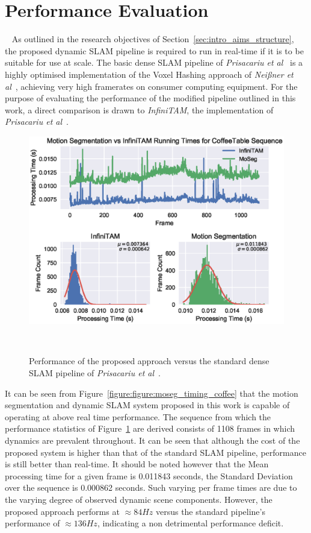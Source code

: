 \section{Performance Evaluation}
~\label{sec:moseg_performance}
As outlined in the research objectives of Section~\ref{sec:intro_aims_structure}, the proposed 
dynamic SLAM pipeline is required to run in real-time if it is to be suitable for use at scale. 
The basic dense SLAM pipeline of \textit{Prisacariu et al}~\cite{Prisacariu2014} is a highly 
optimised implementation of the Voxel Hashing approach of \textit{Nei{\ss}ner et al}~\cite{NieBner2013}, 
achieving very high framerates on consumer computing equipment. For the purpose of evaluating the 
performance of the modified pipeline outlined in this work, a direct comparison is drawn to 
\textit{InfiniTAM}, the implementation of \textit{Prisacariu et al}~\cite{Prisacariu2014}.
\begin{figure}[!htbp]
  \centering
  \includegraphics[width=\linewidth]{figures/moseg/timings_coffee.eps}
  \caption[Motion Segmentation Performance on CoffeeTable Sequence]
  {Performance of the proposed approach versus the standard dense SLAM pipeline of 
  \textit{Prisacariu et al}~\cite{Prisacariu2014}.}
~\label{figure:moseg_timing_coffee}
\end{figure}

It can be seen from Figure~\ref{figure:figure:moseg_timing_coffee} that the motion segmentation and 
dynamic SLAM system proposed in this work is capable of operating at above real time performance. The 
sequence from which the performance statistics of Figure~\ref{figure:moseg_timing_coffee} are derived 
consists of 1108 frames in which dynamics are prevalent throughout. It can be seen that although the 
cost of the proposed system is higher than that of the standard SLAM pipeline, performance is still 
better than real-time. It should be noted however that the Mean processing time for a given frame 
is 0.011843 seconds, the Standard Deviation over the sequence is 0.000862 seconds. Such varying per 
frame times are due to the varying degree of observed dynamic scene components. However, the proposed 
approach performs at \(\approx 84Hz\) versus the standard pipeline's performance of \(\approx 136Hz\), 
indicating a non detrimental performance deficit.

